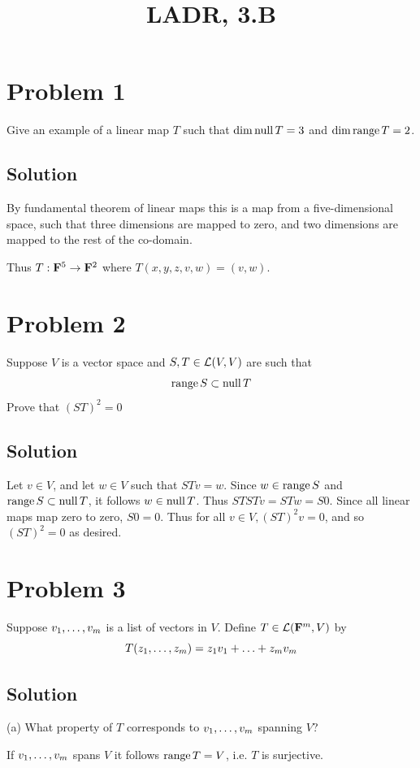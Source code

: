 \documentclass{article}
\title{LADR, 3.B}
\begin{document}
\maketitle

\section*{Problem 1}
Give an example of a linear map $T$ such that $\dim\text{null}\, T=3$ and $\dim\text{range}\, T=2$.

\subsection*{Solution}
By fundamental theorem of linear maps this is a map from a five-dimensional space, such that three dimensions are mapped to zero, and two dimensions are mapped to the rest of the co-domain.

\vs

Thus $T : \mathbf{F}^5\to\mathbf{F}^2$ where $T(x,y,z,v,w)=(v,w)$.

\section*{Problem 2}
Suppose $V$ is a vector space and $S, T\in\L(V, V)$ are such that
\[\text{range}\, S\subset\text{null}\, T\]
Prove that $(ST)^2=0$

\subsection*{Solution}
Let $v\in V$, and let $w\in V$ such that $STv=w$. Since $w\in\text{range}\, S$ and $\text{range}\, S\subset\text{null}\, T$, it follows $w\in\text{null}\, T$. Thus $STSTv=STw=S0$. Since all linear maps map zero to zero, $S0=0$. Thus for all $v\in V, (ST)^2v=0$, and so $(ST)^2=0$ as desired.

\section*{Problem 3}
Suppose $\cons(v,m)$ is a list of vectors in $V$. Define $T\in\L(\F^m,V)$ by
\[T(\cons(z,m))=\suml(z,v,m)\]

\subsection*{Solution}
(a) What property of $T$ corresponds to $\cons(v,m)$ spanning $V$?

If $\cons(v,m)$ spans $V$ it follows $\text{range}\, T=V$, i.e. $T$ is surjective.
\end{document}
